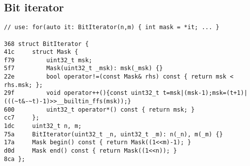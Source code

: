 \documentclass[11pt, a4paper, twoside]{article}
\begin{document}
\subsection{Bit iterator}
\begin{lstlisting}
// use: for(auto it: BitIterator(n,m) { int mask = *it; ... }

368 struct BitIterator {
41c 	struct Mask {
f79 		uint32_t msk;
5f7 		Mask(uint32_t _msk): msk(_msk) {}
22e 		bool operator!=(const Mask& rhs) const { return msk < rhs.msk; };
29f 		void operator++(){const uint32_t t=msk|(msk-1);msk=(t+1)|(((~t&-~t)-1)>>__builtin_ffs(msk));}
600 		uint32_t operator*() const { return msk; }
cc7 	};
1dc 	uint32_t n, m;
75a 	BitIterator(uint32_t _n, uint32_t _m): n(_n), m(_m) {}
17a 	Mask begin() const { return Mask((1<<m)-1); }
d0d 	Mask end() const { return Mask((1<<n)); }
8ca };
\end{lstlisting}
\end{document}
